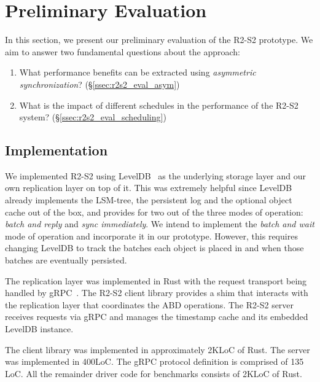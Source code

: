 \section{Preliminary Evaluation}\label{sec:r2s2evaluation}

In this section, we present our preliminary evaluation of the
\ac{R2-S2} prototype. We aim to answer two fundamental questions
about the approach:

\begin{enumerate}
    \item What performance benefits can be extracted using
        \emph{asymmetric synchronization}?
        (\S\ref{ssec:r2s2_eval_asym})
    \item What is the impact of different schedules in the
        performance of the \ac{R2-S2} system?
        (\S\ref{ssec:r2s2_eval_scheduling})
\end{enumerate}

\subsection{Implementation}\label{sec:r2s2implementation}

We implemented \ac{R2-S2} using LevelDB~\cite{leveldb} as the
underlying storage layer and our own replication layer on top of
it. This was extremely helpful since LevelDB already implements
the \ac{LSM-tree}, the persistent log and the optional object cache
out of the box, and provides for two out of the three modes of
operation: \emph{batch and reply} and \emph{sync immediately}.
We intend to implement the \emph{batch and wait} mode of
operation and incorporate it in our prototype. However, this
requires changing LevelDB to track the batches each object is
placed in and when those batches are eventually persisted.

The replication layer was implemented in Rust with the request transport
being handled by gRPC~\cite{grpc}. The \ac{R2-S2} client library
provides a shim that interacts with the replication layer that
coordinates the \ac{ABD} operations. The \ac{R2-S2} server
receives requests via gRPC and manages the timestamp cache and
its embedded LevelDB instance.

The client library was implemented in approximately 2KLoC of
Rust. The server was implemented in 400LoC. The gRPC protocol
definition is comprised of 135 LoC. All the remainder driver code
for benchmarks consists of 2KLoC of Rust.

